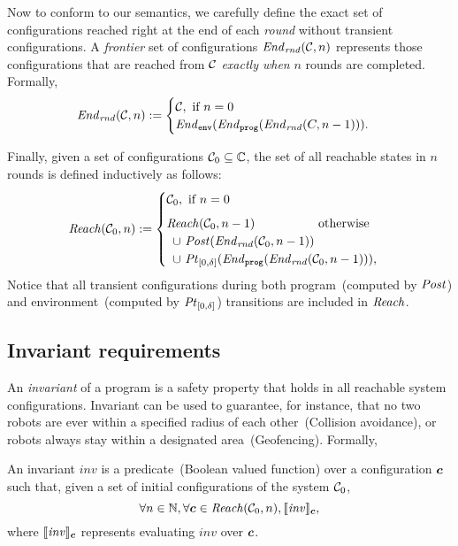 Now to conform to our semantics, we carefully define the exact set of configurations
reached right at the end of each \emph{round} without transient configurations.
A \emph{frontier} set of configurations $\mathit{End}_\mathit{rnd}(\mathcal{C}, n)$ represents those configurations
that are reached from $\mathcal{C}$ \emph{exactly when} $n$ rounds are completed.
Formally,
\[
\mathit{End}_\mathit{rnd}(\mathcal{C},n) :=
    \begin{cases}
        \mathcal{C}, \text{ if } n = 0\\
        \mathit{End}_{\mathtt{env}}(\mathit{End}_{\mathtt{prog}}(\mathit{End}_\mathit{rnd}(C,n-1))).
    \end{cases}
\]


Finally, given a set of configurations $\mathcal{C}_0\subseteq\mathbb{C}$,
the set of all reachable states in $n$ rounds is defined inductively as follows:
\[
\Reach(\gset_0, n) :=
    \begin{cases}
        \gset_0, \text{ if } n = 0 \\[5pt]
        \Reach(\gset_0,n-1) \text{\hspace{1.8cm}otherwise} \\
        \hspace{0.5em} \cup\ \Post(\frontier(\gset_0,n-1))\\
        \hspace{0.5em} \cup\ \pt{0}{\delta}(\Final(\frontier(\gset_0,n-1))),\\
    \end{cases}
\]
Notice that all transient configurations during both program~(computed by $\mathit{Post}$) and environment~(computed by $\mathit{Pt}_{[0,\delta]}$) transitions are included in $\mathit{Reach}$.


\subsection{Invariant requirements}

\newcommand{\Inv}{\mathit{inv}\xspace}

An \emph{invariant} of a \lgname program is a safety property that holds in all reachable system configurations.
Invariant can be used to guarantee, for instance, that no two robots are ever within a specified radius of each other~(Collision avoidance),
or robots always stay within a designated area~(Geofencing).
Formally,
\begin{definition}
An invariant $\Inv$ is a predicate~(Boolean valued function) over a configuration $\mathit{\boldsymbol{c}}$ such that,
given a set of initial configurations of the system $\mathcal{C}_0$,
\[
\forall n\in\naturals, \forall\gconfig \in \Reach(\gset_0, n), \eec{\Inv}{\gconfig},
\]
where $\eec{\Inv}{\gconfig}$ represents evaluating $\Inv$ over $\mathit{\boldsymbol{c}}$.
\end{definition}

